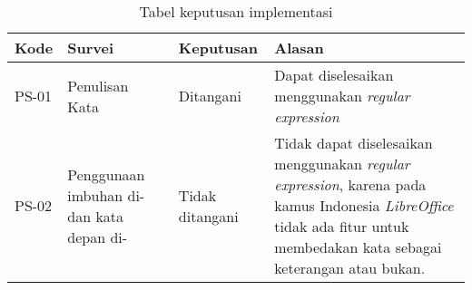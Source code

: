 \begin{table}[H]
	\renewcommand{\arraystretch}{1.5}
	\caption {Tabel keputusan implementasi} \label{tab:keputusan1}
	\begin{center}
		\begin{tabular}{|p{1.5 cm}|>{\raggedright} p{4.3 cm}| p{2.2 cm}| p{6.5 cm}|}
		\hline
		Kode & Survei & Keputusan & Alasan \\ 
		\hline 
		PS-01 & Penulisan Kata & Ditangani & Dapat diselesaikan menggunakan \textit{regular expression} \newline \\ 
		\hline 
		PS-02 & Penggunaan imbuhan di- dan kata depan di- & Tidak \newline ditangani & Tidak dapat diselesaikan menggunakan \textit{regular expression}, karena pada kamus Indonesia \textit{LibreOffice} tidak ada fitur untuk membedakan kata sebagai keterangan atau bukan. \newline \\ 
		\hline 
		\end{tabular}
	\end{center}
\end{table}

